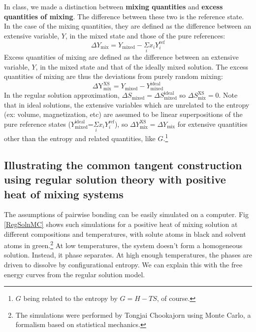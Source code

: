 \documentclass[12pt]{article}
\begin{document}
In class, we made a distinction between \textbf{mixing quantities} and \textbf{excess quantities of mixing}. The difference between these two is the
reference state. In the case of the mixing quantities, they are defined as the difference between an extensive variable, $Y$, in the mixed state and
those of the pure references:
\begin{equation}
\Delta Y_{\text{mix}}=Y_{\text{mixed}}-\underset{i}{\Sigma }x_iY_i^{\text{ref}}\end{equation}
Excess quantities of mixing are defined as the difference between an extensive variable, $Y$, in the mixed state and that of the ideally mixed solution.
The excess quantities of mixing are thus the deviations from purely random mixing:
\begin{equation}
\text{$\Delta $Y}_{\text{mix}}^{\text{XS}}=Y_{\text{mixed}}-Y_{\text{mixed}}^{\text{ideal}}
\end{equation}
In the regular solution approximation, \(\Delta S_{\text{mixed}}=\Delta S_{\text{mixed}}^{\text{ideal}}\) so \(\Delta S_{\text{mix}}^{\text{XS}}=0\).
Note that in ideal solutions, the extensive variables which are unrelated to the entropy (ex: volume, magnetization, etc) are assumed to be linear
superpositions of the pure reference states (\(Y_{\text{mixed}}^{\text{ideal}}\)=\(\underset{i}{\Sigma }x_iY_i^{\text{ref}}\)), so \(\Delta
Y_{\text{mix}}^{\text{XS}}=\Delta Y_{\text{mix}}\) for extensive quantities other than the entropy and related quantities, like $G$.\footnote{$G$ being related to the entropy by $G=H-TS$, of course.}

\subsection{Illustrating the common tangent construction using regular solution theory with positive heat of mixing systems}

The assumptions of pairwise bonding can be easily simulated on a computer.  Fig \ref{RegSolnMC} shows such simulations for a positive heat of mixing solution at different compositions and temperatures, with solute atoms in black and solvent atoms in green.\footnote{The simulations were performed by Tongjai Chookajorn using Monte Carlo, a formalism based on statistical mechanics.} At low temperatures, the system doesn't form a homogeneous solution. Instead, it phase separates. At high enough temperatures, the phases are driven to dissolve by configurational entropy. We can explain this with the free energy curves from the regular solution model.
\end{document}
